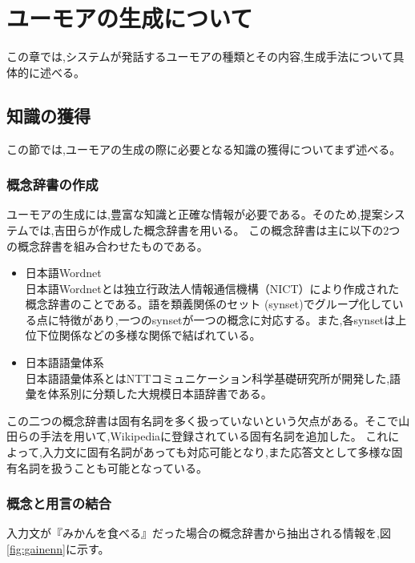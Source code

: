 \chapter{ユーモアの生成について}
この章では,システムが発話するユーモアの種類とその内容,生成手法について具体的に述べる。





\section{知識の獲得}
この節では,ユーモアの生成の際に必要となる知識の獲得についてまず述べる。


\subsection{概念辞書の作成}\label{sec:dict}
ユーモアの生成には,豊富な知識と正確な情報が必要である\cite{Ganso}。そのため,提案システムでは,吉田らが作成した概念辞書\cite{humor_yoshida}を用いる。
この概念辞書は主に以下の2つの概念辞書を組み合わせたものである。
\begin{itemize}
\item 日本語Wordnet\cite{Wordnetweb}\\
\hspace{1zw}日本語Wordnetとは独立行政法人情報通信機構（NICT）により作成された概念辞書のことである。語を類義関係のセット (synset)でグループ化している点に特徴があり,一つのsynsetが一つの概念に対応する。また,各synsetは上位下位関係などの多様な関係で結ばれている。

\item 日本語語彙体系\cite{Goitaikei}\\
\hspace{1zw}日本語語彙体系とはNTTコミュニケーション科学基礎研究所が開発した,語彙を体系別に分類した大規模日本語辞書である。
\end{itemize}
\hspace{1zw}この二つの概念辞書は固有名詞を多く扱っていないという欠点がある。そこで山田ら\cite{Yamada}の手法を用いて,Wikipedia\cite{Wikipedia}に登録されている固有名詞を追加した。
これによって,入力文に固有名詞があっても対応可能となり,また応答文として多様な固有名詞を扱うことも可能となっている。



\subsection{概念と用言の結合}\label{sec:verb}
入力文が『みかんを食べる』だった場合の概念辞書から抽出される情報を,図\ref{fig:gainenn}に示す。


